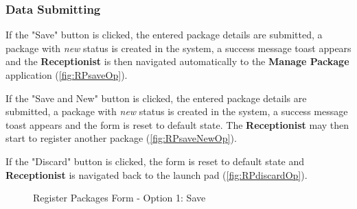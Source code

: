 \subsubsection{Data Submitting}

If the "Save" button is clicked, the entered package details are submitted, a package with \textit{new} status is created in the system, a success message toast appears and the \textbf{Receptionist} is then navigated automatically to the \textbf{Manage Package} application (\autoref{fig:RPsaveOp}).

If the "Save and New" button is clicked, the entered package details are submitted, a package with \textit{new} status is created in the system, a success message toast appears and the form is reset to default state. The \textbf{Receptionist} may then start to register another package (\autoref{fig:RPsaveNewOp}).

If the "Discard" button is clicked, the form is reset to default state and \textbf{Receptionist} is navigated back to the launch pad (\autoref{fig:RPdiscardOp}). 

\begin{figure}[htb]
	\centering
    \begin{subfigure}{1\linewidth}
        \centering
        \vspace{5pt}
    \end{subfigure}%
    \caption{Register Packages Form - Option 1: Save}
    \label{fig:RPsaveOp}
\end{figure}

